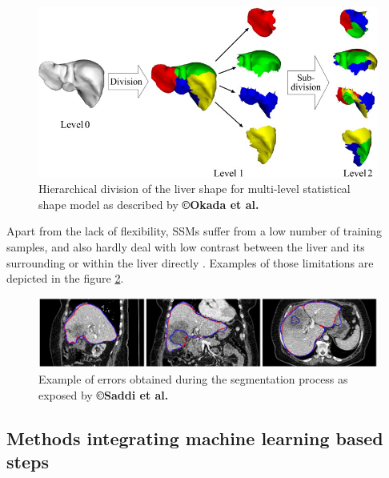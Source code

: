 \begin{figure}[th!]
	\centering
	\includegraphics[width=0.7\linewidth]{images/Okada2008_Fig1}
	\caption{ Hierarchical division of the liver shape for multi-level statistical shape model as described by \textbf{©Okada et al. \cite{Okada2008}}}
	\label{Okada2008_Fig1}
\end{figure}


Apart from the lack of flexibility, SSMs suffer from a low number of
training samples, and also hardly deal with low contrast between the
liver and its surrounding or within the liver directly \cite{Saddi2007, Lamecker2004}. Examples of those limitations are depicted in the figure \ref{Saddi2007_Fig}.

\begin{figure}[th!]
	\centering
	\includegraphics[width=0.7\linewidth]{images/image21}
	\caption{Example of errors obtained during the segmentation process as exposed by \textbf{©Saddi et al. \cite{Saddi2007}}}
	\label{Saddi2007_Fig}
\end{figure}

\subsection{Methods integrating machine learning based steps}

